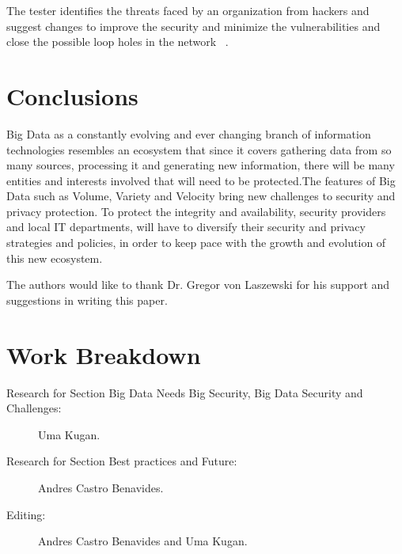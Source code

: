 \documentclass[sigconf]{acmart}
\begin{document}
The  tester identifies the threats faced by an organization from hackers and suggest changes to improve the security and minimize the vulnerabilities and close the possible loop holes in the network ~\cite{shivayogimathoverview}.


\section{Conclusions}

Big Data as a constantly evolving and ever changing branch of information technologies resembles an ecosystem that since it covers gathering data from so many sources, processing it and generating new information, there will be many entities and interests involved that will need to be protected.The features of Big Data such as Volume, Variety and Velocity bring new challenges to security and privacy protection. To protect the integrity and availability, security providers and local IT departments, will have to diversify their security and privacy strategies and policies, in order to keep pace with the growth and evolution of this new ecosystem.

\begin{acks}
The authors would like to thank Dr. Gregor von Laszewski for his support and suggestions in writing this paper.
\end{acks}




\newpage

\appendix

\section{Work Breakdown}

\begin{description}

\item[Research for Section Big Data Needs Big Security, Big Data Security and Challenges:] Uma Kugan.

\item[Research for Section Best practices and Future:] Andres Castro Benavides.

\item[Editing:] Andres Castro Benavides and Uma Kugan.

\end{description}
\end{document}

